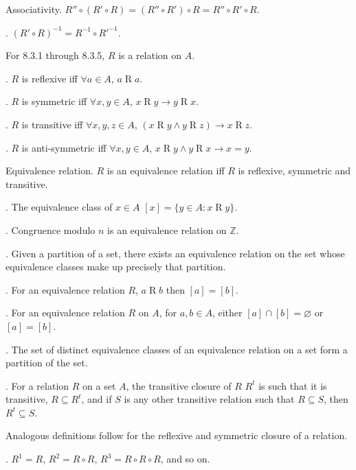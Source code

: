 \documentclass{slnotes}
\begin{document}
 Associativity. \(R'' \circ (R' \circ R) = (R'' \circ R') \circ R = R'' \circ R' \circ R\).

. \((R' \circ R)^{-1} = R^{-1} \circ R'^{-1}\).

For 8.3.1 through 8.3.5, \(R\) is a relation on \(A\).

. \(R\) is reflexive iff \(\forall a \in A\), \(a \mathrel{R} a\).

. \(R\) is symmetric iff \(\forall x, y \in A\), \(x \mathrel{R} y \to y \mathrel{R} x\).

. \(R\) is transitive iff \(\forall x, y, z \in A\), \((x \mathrel{R} y \land y \mathrel{R} z) \to x \mathrel{R} z\).

. \(R\) is anti-symmetric iff \(\forall x, y \in A\), \(x \mathrel{R} y \land y \mathrel{R} x \to x = y\).

 Equivalence relation. \(R\) is an equivalence relation iff \(R\) is reflexive, symmetric and transitive.

. The equivalence class of \(x \in A\) \([x] = \{y \in A : x \mathrel{R} y\}\).

. Congruence modulo \(n\) is an equivalence relation on \(\mathbb{Z}\).

. Given a partition of a set, there exists an equivalence relation on the set whose equivalence classes make up precisely that partition.

. For an equivalence relation \(R\), \(a \mathrel{R} b\) then \([a] = [b]\).

. For an equivalence relation \(R\) on \(A\), for \(a, b \in A\), either \([a] \cap [b] = \varnothing\) or \([a] = [b]\).

. The set of distinct equivalence classes of an equivalence relation on a set form a partition of the set.

. For a relation \(R\) on a set \(A\), the transitive closure of \(R\) \(R^t\) is such that it is transitive, \(R \subseteq R^t\), and if \(S\) is any other transitive relation such that \(R \subseteq S\), then \(R^t \subseteq S\).

Analogous definitions follow for the reflexive and symmetric closure of a relation.

. \(R^1 = R\), \(R^2 = R \circ R\), \(R^3 = R \circ R \circ R\), and so on.
\end{document}
